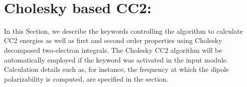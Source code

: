 ~%
\section{Cholesky based CC2: }
\label{sec:chocc2}

In this Section, we describe the keywords controlling the algorithm to 
calculate CC2 energies as well as first  and  second order properties using Cholesky 
decomposed two-electron integrals. The Cholesky CC2 algorithm will be
automatically employed if the keyword  was activated in the
 input module.  Calculation details such as, for instance, the
frequency at which the dipole polarizability is computed, are specified
in the  section.


\begin{center}
\end{center}

